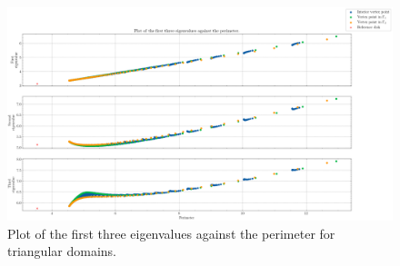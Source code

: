 \begin{figure}[!htb]
    \centering
    \begin{minipage}[c]{0.8\textwidth}
        \centering
        \includegraphics[width=\textwidth]{Images/Dirac/triangles/triangle_first_eigenvalues.png}
        \caption{Plot of the first three eigenvalues against the perimeter for triangular domains.}
        \label{dirac_smooth_first_eigenvalues}
    \end{minipage}

    \vspace{0.5cm}


\end{figure}

